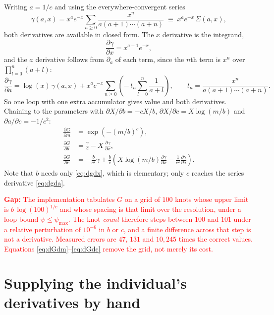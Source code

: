 \documentclass[11pt,a4paper]{article}
\newcommand{\dd}[2]{\frac{\partial #1}{\partial #2}}
\newcommand{\gap}[1]{\textcolor{red}{\textbf{Gap:} #1}}
\begin{document}
Writing $a = 1/c$ and using the everywhere-convergent series
\begin{equation}
\gamma(a, x) = x^{a} e^{-x} \sum_{n \ge 0}
\frac{x^{n}}{a(a+1)\cdots(a+n)}
\;\equiv\; x^{a} e^{-x} \, \Sigma(a,x),
\label{eq:gammaseries}
\end{equation}
both derivatives are available in closed form. The $x$ derivative is the
integrand,
\begin{equation}
\dd{\gamma}{x} = x^{a-1} e^{-x},
\label{eq:dgdx}
\end{equation}
and the $a$ derivative follows from $\partial_a$ of each term, since the $n$th
term is $x^n$ over $\prod_{l=0}^{n}(a+l)$:
\begin{equation}
\dd{\gamma}{a} = \log(x)\,\gamma(a,x)
  + x^{a} e^{-x} \sum_{n\ge 0}
    \left(-\,t_n \sum_{l=0}^{n} \frac{1}{a+l}\right),
\qquad
t_n = \frac{x^{n}}{a(a+1)\cdots(a+n)} .
\label{eq:dgda}
\end{equation}
So one loop with one extra accumulator gives value and both derivatives. Chaining
to the parameters with $\partial X/\partial b = -cX/b$,
$\partial X/\partial c = X \log(m/b)$ and $\partial a/\partial c = -1/c^2$:
\begin{align}
\dd{G}{m} &= \exp\!\left(-\left(m/b\right)^{c}\right),
\label{eq:dGdm}\\
\dd{G}{b} &= \frac{\gamma}{c} - X \,\dd{\gamma}{x},
\label{eq:dGdb}\\
\dd{G}{c} &= -\frac{b}{c^{2}}\gamma
  + \frac{b}{c}\left( X \log(m/b) \dd{\gamma}{x}
  - \frac{1}{c^{2}} \dd{\gamma}{a} \right).
\label{eq:dGdc}
\end{align}
Note that $b$ needs only \eqref{eq:dgdx}, which is elementary; only $c$ reaches
the series derivative \eqref{eq:dgda}.

\gap{The implementation tabulates $G$ on a grid of $100$ knots whose upper limit
is $b\,\log(100)^{1/c}$ and whose spacing is that limit over the resolution, under
a loop bound $\psi \le \psi_{\max}$. The knot \emph{count} therefore steps between
$100$ and $101$ under a relative perturbation of $10^{-6}$ in $b$ or $c$, and a
finite difference across that step is not a derivative. Measured errors are $47$,
$131$ and $10{,}245$ times the correct values. Equations
\eqref{eq:dGdm}--\eqref{eq:dGdc} remove the grid, not merely its cost.}

\section{Supplying the individual's derivatives by hand}
\label{sec:supplied}
\end{document}
